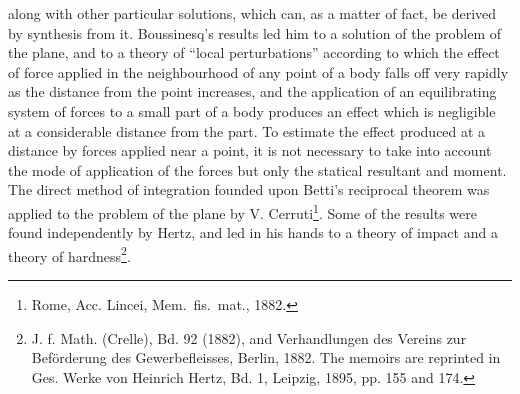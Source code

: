 along with other particular solutions, which can, as a matter
of fact, be derived by synthesis from it. Boussinesq's results
led him to a solution of the problem of the plane, and to a theory of
``local perturbations'' according to which the effect of force applied
in the neighbourhood of any point of a body falls off very rapidly as
the distance from the point increases, and the application of an
equilibrating system of forces to a small part of a body produces an
effect which is negligible at a considerable distance from the part.
To estimate the effect produced at a distance by forces applied
near a point, it is not necessary to take into account the mode of
application of the forces but only the statical resultant and moment.
The direct method of integration founded upon Betti's reciprocal
theorem was applied to the problem of the plane by V.
Cerruti\footnote{Rome, Acc. Lincei, Mem.\ fis.\ mat., 1882.
}. Some of the results were found independently by Hertz, and
led in his hands to a theory of impact and a theory of
hardness\footnote{J. f. Math. (Crelle), Bd. 92 (1882), and Verhandlungen
des Vereins zur Beförderung des Gewerbefleisses, Berlin, 1882. The memoirs
are reprinted in Ges. Werke von Heinrich Hertz, Bd. 1, Leipzig, 1895, pp. 155 and 174.
}.

